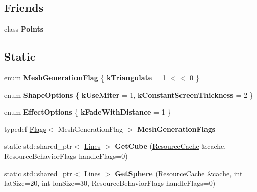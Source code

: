 \subsection*{Friends}
\begin{DoxyCompactItemize}
\item 
\mbox{\label{classrev_1_1_lines_a270bf52546af125e874e53399ac12b5f}} 
class {\bfseries Points}
\end{DoxyCompactItemize}
\subsection*{Static}
\begin{DoxyCompactItemize}
\item 
\mbox{\label{classrev_1_1_lines_a35550091d7f6d71deceef02f81bcd24e}} 
enum {\bfseries Mesh\+Generation\+Flag} \{ {\bfseries k\+Triangulate} = 1 $<$$<$ 0
 \}
\item 
\mbox{\label{classrev_1_1_lines_ae8942897689541981d4dd0e1da7d6e66}} 
enum {\bfseries Shape\+Options} \{ {\bfseries k\+Use\+Miter} = 1, 
{\bfseries k\+Constant\+Screen\+Thickness} = 2
 \}
\item 
\mbox{\label{classrev_1_1_lines_aaef973ead3e1af6203aa526de798fd20}} 
enum {\bfseries Effect\+Options} \{ {\bfseries k\+Fade\+With\+Distance} = 1
 \}
\item 
\mbox{\label{classrev_1_1_lines_a56d76fe4d58a67106403207ee3b5be0d}} 
typedef \mbox{\hyperlink{classrev_1_1_flags}{Flags}}$<$ Mesh\+Generation\+Flag $>$ {\bfseries Mesh\+Generation\+Flags}
\item 
\mbox{\label{classrev_1_1_lines_a58a625a7035b3595ccfdf27ff855fbac}} 
static std\+::shared\+\_\+ptr$<$ \mbox{\hyperlink{classrev_1_1_lines}{Lines}} $>$ {\bfseries Get\+Cube} (\mbox{\hyperlink{classrev_1_1_resource_cache}{Resource\+Cache}} \&cache, Resource\+Behavior\+Flags handle\+Flags=0)
\item 
\mbox{\label{classrev_1_1_lines_a4f541d99da5883f5c3be1410507489c4}} 
static std\+::shared\+\_\+ptr$<$ \mbox{\hyperlink{classrev_1_1_lines}{Lines}} $>$ {\bfseries Get\+Sphere} (\mbox{\hyperlink{classrev_1_1_resource_cache}{Resource\+Cache}} \&cache, int lat\+Size=20, int lon\+Size=30, Resource\+Behavior\+Flags handle\+Flags=0)
$$
\end{DoxyCompactItemize}
